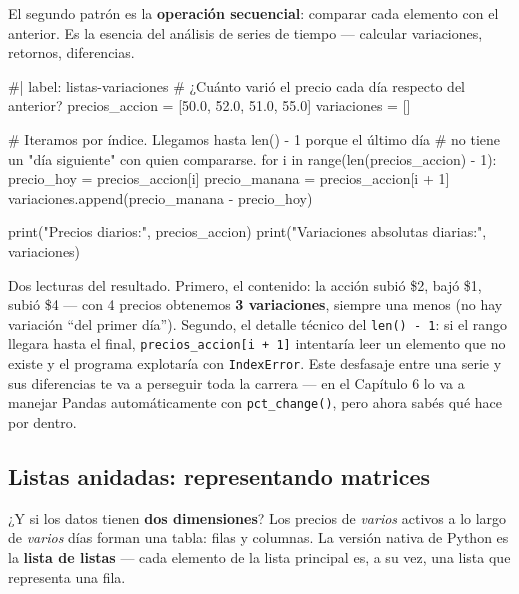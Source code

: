 \documentclass[
  spanish,
  letterpaper,
  DIV=11,
  numbers=noendperiod]{scrreprt}
\newenvironment{Shaded}{\begin{snugshade}}{\end{snugshade}}
\newcommand{\NormalTok}[1]{\textcolor[rgb]{0.00,0.23,0.31}{#1}}
\begin{document}
El segundo patrón es la \textbf{operación secuencial}: comparar cada
elemento con el anterior. Es la esencia del análisis de series de tiempo
--- calcular variaciones, retornos, diferencias.

\begin{Shaded}
\begin{Highlighting}[]
\NormalTok{\#| label: listas{-}variaciones}
\NormalTok{\# ¿Cuánto varió el precio cada día respecto del anterior?}
\NormalTok{precios\_accion = [50.0, 52.0, 51.0, 55.0]}
\NormalTok{variaciones = []}

\NormalTok{\# Iteramos por índice. Llegamos hasta len() {-} 1 porque el último día}
\NormalTok{\# no tiene un "día siguiente" con quien compararse.}
\NormalTok{for i in range(len(precios\_accion) {-} 1):}
\NormalTok{    precio\_hoy = precios\_accion[i]}
\NormalTok{    precio\_manana = precios\_accion[i + 1]}
\NormalTok{    variaciones.append(precio\_manana {-} precio\_hoy)}

\NormalTok{print("Precios diarios:", precios\_accion)}
\NormalTok{print("Variaciones absolutas diarias:", variaciones)}
\end{Highlighting}
\end{Shaded}

Dos lecturas del resultado. Primero, el contenido: la acción subió \$2,
bajó \$1, subió \$4 --- con 4 precios obtenemos \textbf{3 variaciones},
siempre una menos (no hay variación ``del primer día''). Segundo, el
detalle técnico del \texttt{len()\ -\ 1}: si el rango llegara hasta el
final, \texttt{precios\_accion{[}i\ +\ 1{]}} intentaría leer un elemento
que no existe y el programa explotaría con \texttt{IndexError}. Este
desfasaje entre una serie y sus diferencias te va a perseguir toda la
carrera --- en el Capítulo 6 lo va a manejar Pandas automáticamente con
\texttt{pct\_change()}, pero ahora sabés qué hace por dentro.

\subsection{Listas anidadas: representando
matrices}\label{listas-anidadas-representando-matrices}

¿Y si los datos tienen \textbf{dos dimensiones}? Los precios de
\emph{varios} activos a lo largo de \emph{varios} días forman una tabla:
filas y columnas. La versión nativa de Python es la \textbf{lista de
listas} --- cada elemento de la lista principal es, a su vez, una lista
que representa una fila.
\end{document}
